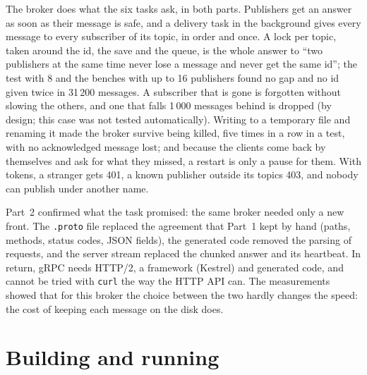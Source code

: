 \documentclass[11pt,a4paper]{article}
\newcommand{\code}[1]{{\frenchspacing\texttt{#1}}}
\begin{document}
The broker does what the six tasks ask, in both parts. Publishers get an answer as soon as their
message is safe, and a delivery task in the background gives every message to every subscriber of
its topic, in order and once. A lock per topic, taken around the id, the save and the queue, is the
whole answer to ``two publishers at the same time never lose a message and never get the same id'';
the test with 8 and the benches with up to 16 publishers found no gap and no id given twice in
31\,200 messages. A subscriber that is gone is forgotten without slowing the others, and one that
falls 1\,000 messages behind is dropped (by design; this case was not tested automatically).
Writing to a temporary file and renaming it made the broker survive being killed, five times in a row
in a test, with no acknowledged message lost; and because the clients come back by themselves and ask
for what they missed, a restart is only a pause for them. With tokens, a stranger gets 401, a known
publisher outside its topics 403, and nobody can publish under another name.

Part~2 confirmed what the task promised: the same broker needed only a new front. The \code{.proto}
file replaced the agreement that Part~1 kept by hand (paths, methods, status codes, JSON fields), the
generated code removed the parsing of requests, and the server stream replaced the chunked answer and
its heartbeat. In return, gRPC needs HTTP/2, a framework (Kestrel) and generated code, and cannot be
tried with \code{curl} the way the HTTP API can. The measurements showed that for this broker the
choice between the two hardly changes the speed: the cost of keeping each message on the disk does.

\appendix

\section{Building and running}\label{app:run}
\end{document}
